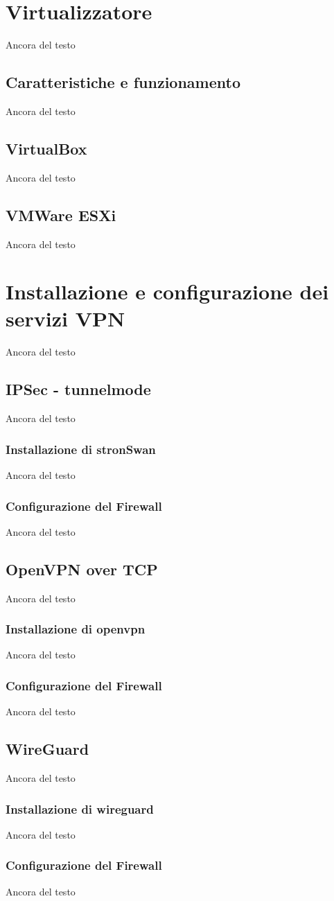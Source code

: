 \section{Virtualizzatore}
Ancora del testo

\subsection{Caratteristiche e funzionamento}
Ancora del testo
\subsection{VirtualBox}
Ancora del testo
\subsection{VMWare ESXi}
Ancora del testo


\section{Installazione e configurazione dei servizi VPN}
Ancora del testo

\subsection{IPSec - tunnelmode}
Ancora del testo
\subsubsection{Installazione di stronSwan}
Ancora del testo
\subsubsection{Configurazione del Firewall}
Ancora del testo

\subsection{OpenVPN over TCP}
Ancora del testo
\subsubsection{Installazione di openvpn}
Ancora del testo
\subsubsection{Configurazione del Firewall}
Ancora del testo

\subsection{WireGuard}
Ancora del testo
\subsubsection{Installazione di wireguard}
Ancora del testo
\subsubsection{Configurazione del Firewall}
Ancora del testo